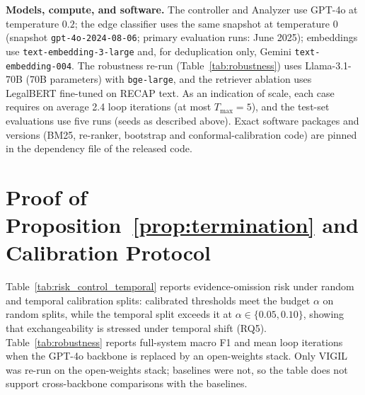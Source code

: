 \textbf{Models, compute, and software.} The controller and Analyzer use GPT-4o at temperature $0.2$; the edge classifier uses the same snapshot at temperature $0$ (snapshot \texttt{gpt-4o-2024-08-06}; primary evaluation runs: June 2025); embeddings use \texttt{text-embedding-3-large} and, for deduplication only, Gemini \texttt{text-embedding-004}. The robustness re-run (Table~\ref{tab:robustness}) uses Llama-3.1-70B (70B parameters) with \texttt{bge-large}, and the retriever ablation uses LegalBERT fine-tuned on RECAP text. As an indication of scale, each case requires on average 2.4 loop iterations (at most $T_{\max}{=}5$), and the test-set evaluations use five runs (seeds as described above). Exact software packages and versions (BM25, re-ranker, bootstrap and conformal-calibration code) are pinned in the dependency file of the released code.

\section{Proof of Proposition~\ref{prop:termination} and Calibration Protocol}
\label{app:theory}

Table~\ref{tab:risk_control_temporal} reports evidence-omission risk under random and temporal calibration splits: calibrated thresholds meet the budget $\alpha$ on random splits, while the temporal split exceeds it at $\alpha\in\{0.05,0.10\}$, showing that exchangeability is stressed under temporal shift (RQ5).
Table~\ref{tab:robustness} reports full-system macro F1 and mean loop iterations when the GPT-4o backbone is replaced by an open-weights stack. Only VIGIL was re-run on the open-weights stack; baselines were not, so the table does not support cross-backbone comparisons with the baselines.

